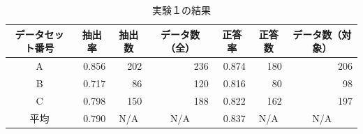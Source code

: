 \begin{table}[H]
\caption{実験１の結果}
\centering
\begin{tabular}{|c||r|r|r||r|r|r|}
\hline
\multicolumn{1}{|c||}{データセット番号} & \multicolumn{1}{c|}{抽出率}
  & \multicolumn{1}{c|}{抽出数} & \multicolumn{1}{c||}{データ数（全）}
  & \multicolumn{1}{c|}{正答率} & \multicolumn{1}{c|}{正答数}
  & \multicolumn{1}{c|}{データ数（対象）} \\ \hline \hline
A & 0.856 & 202 & 236 & 0.874 & 180 & 206\\ \hline
B & 0.717 & 86 & 120 & 0.816 & 80 & 98\\ \hline
C & 0.798 & 150 & 188 & 0.822 & 162 & 197\\ \hline
平均 & 0.790
  & \multicolumn{1}{c|}{N/A} & \multicolumn{1}{c||}{N/A}
  & 0.837 & \multicolumn{1}{c|}{N/A}
  & \multicolumn{1}{c|}{N/A} \\ \hline
\end{tabular}
\label{table:resultEx1e}
\end{table}
